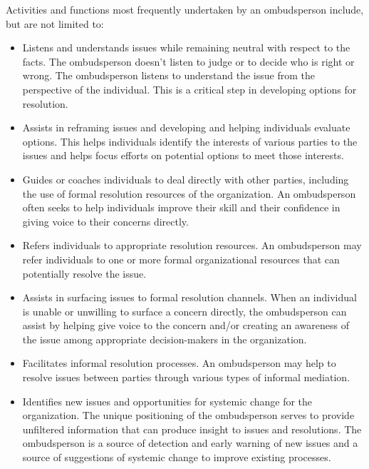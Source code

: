 \documentclass[12pt]{article}
\begin{document}
Activities and functions most frequently undertaken by an ombudsperson include, but are not limited to:
\begin{itemize}
\item Listens and understands issues while remaining neutral with respect to the facts. The ombudsperson doesn’t listen to judge or to decide who is right or wrong. The ombudsperson listens to understand the issue from the perspective of the individual. This is a critical step in developing options for resolution.
\item Assists in reframing issues and developing and helping individuals evaluate options. This helps individuals identify the interests of various parties to the issues and helps focus efforts on potential options to meet those interests.
\item Guides or coaches individuals to deal directly with other parties, including the use of formal resolution resources of the organization. An ombudsperson often seeks to help individuals improve their skill and their confidence in giving voice to their concerns directly.
\item Refers individuals to appropriate resolution resources. An ombudsperson may refer individuals to one or more formal organizational resources that can potentially resolve the issue.
\item Assists in surfacing issues to formal resolution channels. When an individual is unable or unwilling to surface a concern directly, the ombudsperson can assist by helping give voice to the concern and/or creating an awareness of the issue among appropriate decision-makers in the organization.
\item Facilitates informal resolution processes. An ombudsperson may help to resolve issues between parties through various types of informal mediation.
\item Identifies new issues and opportunities for systemic change for the organization. The unique positioning of the ombudsperson serves to provide unfiltered information that can produce insight to issues and resolutions. The ombudsperson is a source of detection and early warning of new issues and a source of suggestions of systemic change to improve existing processes.
\end{itemize}
\end{document}
